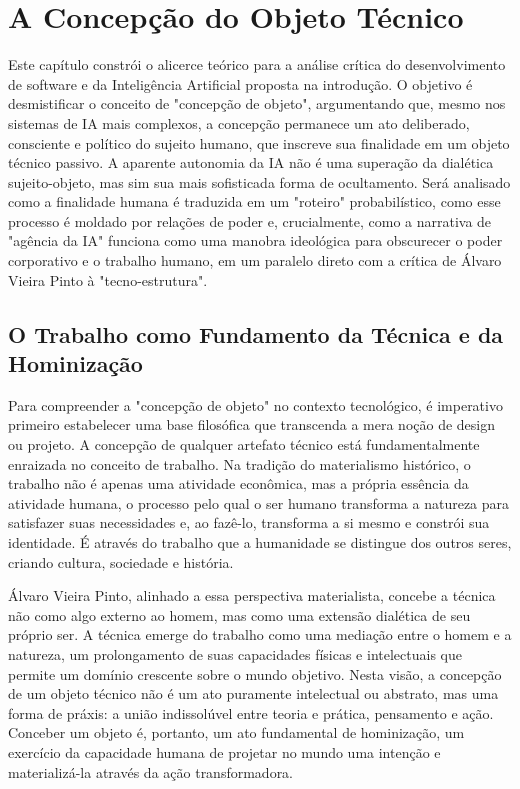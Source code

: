 \chapter{A Concepção do Objeto Técnico}\label{cap:concepcao_obj_tecnico}

Este capítulo constrói o alicerce teórico para a análise crítica do desenvolvimento de software e da Inteligência Artificial proposta na introdução. O objetivo é desmistificar 
o conceito de "concepção de objeto", argumentando que, mesmo nos sistemas de IA mais complexos, a concepção permanece um ato deliberado, consciente e político do sujeito humano, 
que inscreve sua finalidade em um objeto técnico passivo. A aparente autonomia da IA não é uma superação da dialética sujeito-objeto, mas sim sua mais sofisticada forma de 
ocultamento. Será analisado como a finalidade humana é traduzida em um "roteiro" probabilístico, como esse processo é moldado por relações de poder e, crucialmente, como a 
narrativa de "agência da IA" funciona como uma manobra ideológica para obscurecer o poder corporativo e o trabalho humano, em um paralelo direto com a crítica de Álvaro Vieira 
Pinto à "tecno-estrutura".

\section{O Trabalho como Fundamento da Técnica e da Hominização}\label{sec:trabalho_como_fundamento}

Para compreender a "concepção de objeto" no contexto tecnológico, é imperativo primeiro estabelecer uma base filosófica que transcenda a mera noção de design ou projeto. 
A concepção de qualquer artefato técnico está fundamentalmente enraizada no conceito de trabalho. Na tradição do materialismo histórico, o trabalho não é apenas uma atividade 
econômica, mas a própria essência da atividade humana, o processo pelo qual o ser humano transforma a natureza para satisfazer suas necessidades e, ao fazê-lo, transforma a si 
mesmo e constrói sua identidade. É através do trabalho que a humanidade se distingue dos outros seres, criando cultura, sociedade e história.   

Álvaro Vieira Pinto, alinhado a essa perspectiva materialista, concebe a técnica não como algo externo ao homem, mas como uma extensão dialética de seu próprio ser. A técnica 
emerge do trabalho como uma mediação entre o homem e a natureza, um prolongamento de suas capacidades físicas e intelectuais que permite um domínio crescente sobre o mundo 
objetivo. Nesta visão, a concepção de um objeto técnico não é um ato puramente intelectual ou abstrato, mas uma forma de práxis: a união indissolúvel entre teoria e prática, 
pensamento e ação. Conceber um objeto é, portanto, um ato fundamental de hominização, um exercício da capacidade humana de projetar no mundo uma intenção e materializá-la 
através da ação transformadora.


